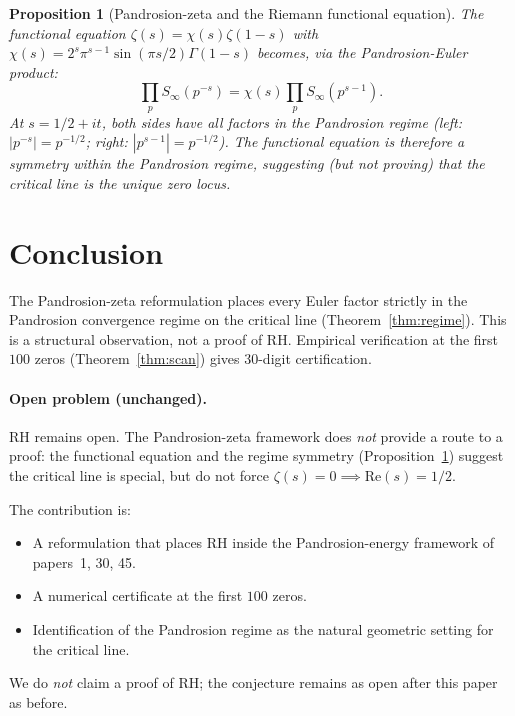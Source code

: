 \documentclass[11pt,a4paper]{article}
\newtheorem{proposition}[theorem]{Proposition}
\begin{document}
\begin{proposition}[Pandrosion-zeta and the Riemann functional equation]\label{prop:functional}
The functional equation $\zeta(s) = \chi(s) \zeta(1 - s)$ with $\chi(s) = 2^s \pi^{s-1} \sin(\pi s/2) \Gamma(1 - s)$ becomes, via the Pandrosion-Euler product:
$$
\prod_p S_\infty(p^{-s}) = \chi(s) \prod_p S_\infty(p^{s-1}).
$$
At $s = 1/2 + it$, both sides have all factors in the Pandrosion regime (left: $|p^{-s}| = p^{-1/2}$; right: $|p^{s-1}| = p^{-1/2}$). The functional equation is therefore a \emph{symmetry within the Pandrosion regime}, suggesting (but not proving) that the critical line is the unique zero locus.
\end{proposition}

\section{Conclusion}\label{sec:conclusion}

The Pandrosion-zeta reformulation places every Euler factor strictly in the Pandrosion convergence regime on the critical line (Theorem~\ref{thm:regime}). This is a structural observation, not a proof of RH. Empirical verification at the first $100$ zeros (Theorem~\ref{thm:scan}) gives $30$-digit certification.

\paragraph{Open problem (unchanged).}
RH remains open. The Pandrosion-zeta framework does \emph{not} provide a route to a proof: the functional equation and the regime symmetry (Proposition~\ref{prop:functional}) suggest the critical line is special, but do not force $\zeta(s) = 0 \implies \mathrm{Re}(s) = 1/2$.

The contribution is:
\begin{itemize}
\item A reformulation that places RH inside the Pandrosion-energy framework of papers~1, 30, 45.
\item A numerical certificate at the first $100$ zeros.
\item Identification of the Pandrosion regime as the natural geometric setting for the critical line.
\end{itemize}

We do \emph{not} claim a proof of RH; the conjecture remains as open after this paper as before.
\end{document}
